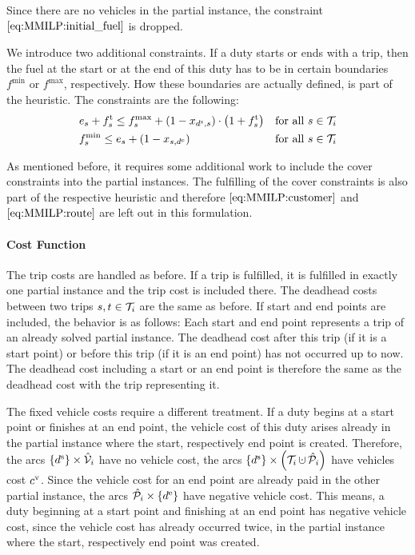 Since there are no vehicles in the partial instance, the constraint $\eqref{eq:MMILP:initial_fuel}$ is dropped.

We introduce two additional constraints. If a duty starts or ends with a trip, then the fuel at the start or at the end of this duty has to be in certain boundaries $f^{\min}$ or $f^{\max}$, respectively. How these boundaries are actually defined, is part of the heuristic. The constraints are the following:
\begin{align}
	& e_s + f^{\operatorname{t}}_s \leq f^{\max}_s + \left(1-x_{d^{\operatorname{s}},s}\right)\cdot\left(1+f^{\operatorname{t}}_s\right) && \text{for all } s\in\mathcal{T}_i \label{eq:CMILP:fmax} \\
	& f^{\min}_s \leq e_s + \left(1-x_{s,d^{\operatorname{e}}}\right) && \text{for all } s\in\mathcal{T}_i \label{eq:CMILP:fmin}
\end{align}

As mentioned before, it requires some additional work to include the cover constraints into the partial instances. The fulfilling of the cover constraints is also part of the respective heuristic and therefore $\eqref{eq:MMILP:customer}$ and $\eqref{eq:MMILP:route}$ are left out in this formulation.

\paragraph{Cost Function} \parfill

The trip costs are handled as before. If a trip is fulfilled, it is fulfilled in exactly one partial instance and the trip cost is included there. The deadhead costs between two trips $s,t\in\mathcal{T}_i$ are the same as before. If start and end points are included, the behavior is as follows: Each start and end point represents a trip of an already solved partial instance. The deadhead cost after this trip (if it is a start point) or before this trip (if it is an end point) has not occurred up to now. The deadhead cost including a start or an end point is therefore the same as the deadhead cost with the trip representing it.

The fixed vehicle costs require a different treatment. If a duty begins at a start point or finishes at an end point, the vehicle cost of this duty arises already in the partial instance where the start, respectively end point is created. Therefore, the arcs ${\left\{d^{\operatorname{s}}\right\}\times\hat{\mathcal{V}}_i}$ have no vehicle cost, the arcs ${\left\{\ds\right\}\times\left(\Ti\cupdot\Phat_i\right)}$ have vehicles cost $c^{\operatorname{v}}$. Since the vehicle cost for an end point are already paid in the other partial instance, the arcs ${\hat{\mathcal{P}}_i\times\left\{d^{\operatorname{e}}\right\}}$ have negative vehicle cost. This means, a duty beginning at a start point and finishing at an end point has negative vehicle cost, since the vehicle cost has already occurred twice, in the partial instance where the start, respectively end point was created.


